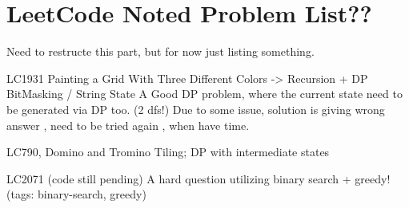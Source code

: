 \chapter{LeetCode Noted Problem List??}\label{chp:PraticeList?}


Need to restructe this part, but for now just listing something.

\begin{compactenum}
    \item LC1931 Painting a Grid With Three Different Colors -> Recursion + DP BitMasking / String State
    A Good DP problem, where the current state need to be generated via DP too. (2 dfs!)
    Due to some issue, solution is giving wrong answer , need to be tried again , when have time.

    \item LC790, Domino and Tromino Tiling;  DP with intermediate states
    
    \item LC2071 (code still pending) A hard question utilizing binary search + greedy! (tags: binary-search, greedy)
\end{compactenum}